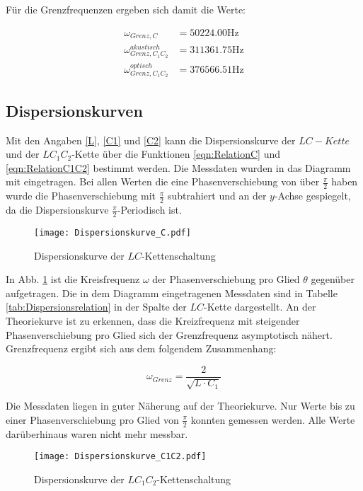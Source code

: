 Für die Grenzfrequenzen ergeben sich damit die Werte:

\begin{align}
  \omega_{Grenz,C} &= \num{50224,00}\si{\hertz}\\
  \omega_{Grenz,C_1C_2}^{akustisch} &= \num{311361,75}\si{\hertz}\\
  \omega_{Grenz,C_1C_2}^{optisch} &= \num{376566,51}\si{\hertz}
\end{align}

\subsection{Dispersionskurven}

Mit den Angaben \eqref{L}, \eqref{C1} und \eqref{C2} kann die Dispersionskurve
der $LC-Kette$ und der $LC_1C_2$-Kette über die Funktionen \eqref{eqn:RelationC}
und \eqref{eqn:RelationC1C2} bestimmt werden.
Die Messdaten wurden in das Diagramm mit eingetragen. Bei allen Werten die eine
Phasenverschiebung von über $\frac{\pi}{2}$ haben wurde die Phasenverschiebung
mit $\frac{\pi}{2}$ subtrahiert und an der $y$-Achse gespiegelt,
da die Dispersionskurve $\frac{\pi}{2}$-Periodisch ist.

\begin{figure}
  \texttt{[image: Dispersionskurve\_C.pdf]}
  \caption{Dispersionskurve der $LC$-Kettenschaltung}
  \label{fig:DispersionC}
\end{figure}

In Abb. \ref{fig:DispersionC} ist die Kreisfrequenz $\omega$ der Phasenverschiebung
pro Glied $\theta$ gegenüber aufgetragen. Die in dem Diagramm eingetragenen
Messdaten sind in Tabelle \ref{tab:Dispersionsrelation} in der Spalte
der $LC$-Kette dargestellt. An der Theoriekurve ist zu erkennen, dass die Kreizfrequenz
mit steigender Phasenverschiebung pro Glied sich der Grenzfrequenz asymptotisch
nähert. Grenzfrequenz ergibt sich aus dem folgendem Zusammenhang:

\begin{equation}
  \label{eqn:Grenzfrequenz}
  \omega_{Grenz} = \frac{2}{\sqrt{L\cdot C_1}}
\end{equation}

Die Messdaten liegen in guter Näherung auf der Theoriekurve.
Nur Werte bis zu einer Phasenverschiebung pro Glied von $\frac{\pi}{2}$
konnten gemessen werden. Alle Werte darüberhinaus waren nicht mehr messbar.

\FloatBarrier
\begin{figure}
  \texttt{[image: Dispersionskurve\_C1C2.pdf]}
  \caption{Dispersionskurve der $LC_1C_2$-Kettenschaltung}
  \label{fig:DispersionC1C2}
\end{figure}
\FloatBarrier

